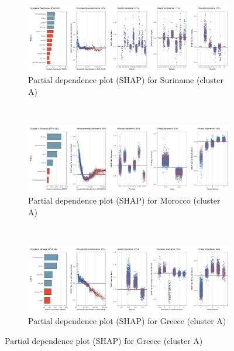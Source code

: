 \begin{figure}[ht!]\ContinuedFloat
    \centering
   \begin{subfigure}[b]{\textwidth}
         \centering
         \caption{Partial dependence plot (SHAP) for Suriname (cluster A)}
         \label{fig:5b_SUR}
         \includegraphics[width=\textwidth]{Figure 5b/Figure_5b_SUR}         
     \end{subfigure}
    \\
    \vspace{0.5cm}
   \begin{subfigure}[b]{\textwidth}
         \centering
         \caption{Partial dependence plot (SHAP) for Morocco (cluster A)}
         \label{fig:5b_MAR}
         \includegraphics[width=\textwidth]{Figure 5b/Figure_5b_MAR}         
     \end{subfigure}
    \\
    \vspace{0.5cm}
   \begin{subfigure}[b]{\textwidth}
         \centering
         \caption{Partial dependence plot (SHAP) for Greece (cluster A)}
         \label{fig:5b_GRC}
         \includegraphics[width=\textwidth]{Figure 5b/Figure_5b_GRC}

\end{subfigure}
\end{figure}
